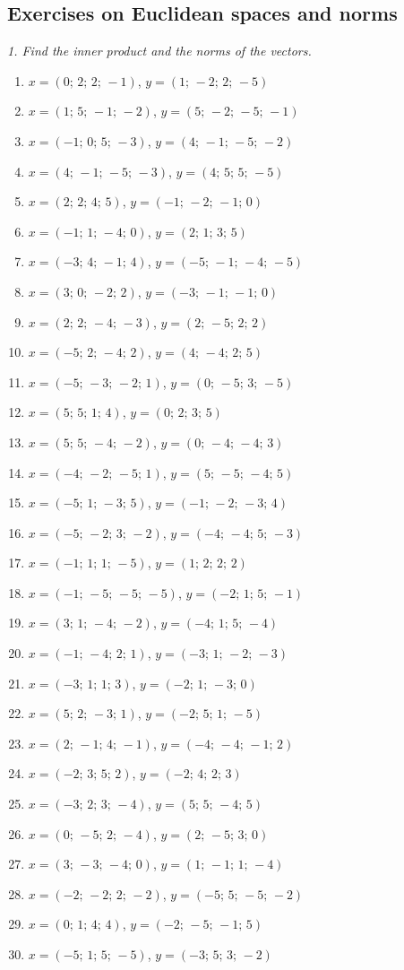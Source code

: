 \subsection{Exercises on Euclidean spaces and norms}

\emph{1. Find the inner product and the norms of the vectors.}
\bigskip
\begin{enumerate}[label=\arabic*., leftmargin=*]
\item $x=(0;\,2;\,2;\,-1)$, $y=(1;\,-2;\,2;\,-5)$
\item $x=(1;\,5;\,-1;\,-2)$, $y=(5;\,-2;\,-5;\,-1)$
\item $x=(-1;\,0;\,5;\,-3)$, $y=(4;\,-1;\,-5;\,-2)$
\item $x=(4;\,-1;\,-5;\,-3)$, $y=(4;\,5;\,5;\,-5)$
\item $x=(2;\,2;\,4;\,5)$, $y=(-1;\,-2;\,-1;\,0)$
\item $x=(-1;\,1;\,-4;\,0)$, $y=(2;\,1;\,3;\,5)$
\item $x=(-3;\,4;\,-1;\,4)$, $y=(-5;\,-1;\,-4;\,-5)$
\item $x=(3;\,0;\,-2;\,2)$, $y=(-3;\,-1;\,-1;\,0)$
\item $x=(2;\,2;\,-4;\,-3)$, $y=(2;\,-5;\,2;\,2)$
\item $x=(-5;\,2;\,-4;\,2)$, $y=(4;\,-4;\,2;\,5)$
\item $x=(-5;\,-3;\,-2;\,1)$, $y=(0;\,-5;\,3;\,-5)$
\item $x=(5;\,5;\,1;\,4)$, $y=(0;\,2;\,3;\,5)$
\item $x=(5;\,5;\,-4;\,-2)$, $y=(0;\,-4;\,-4;\,3)$
\item $x=(-4;\,-2;\,-5;\,1)$, $y=(5;\,-5;\,-4;\,5)$
\item $x=(-5;\,1;\,-3;\,5)$, $y=(-1;\,-2;\,-3;\,4)$
\item $x=(-5;\,-2;\,3;\,-2)$, $y=(-4;\,-4;\,5;\,-3)$
\item $x=(-1;\,1;\,1;\,-5)$, $y=(1;\,2;\,2;\,2)$
\item $x=(-1;\,-5;\,-5;\,-5)$, $y=(-2;\,1;\,5;\,-1)$
\item $x=(3;\,1;\,-4;\,-2)$, $y=(-4;\,1;\,5;\,-4)$
\item $x=(-1;\,-4;\,2;\,1)$, $y=(-3;\,1;\,-2;\,-3)$
\item $x=(-3;\,1;\,1;\,3)$, $y=(-2;\,1;\,-3;\,0)$
\item $x=(5;\,2;\,-3;\,1)$, $y=(-2;\,5;\,1;\,-5)$
\item $x=(2;\,-1;\,4;\,-1)$, $y=(-4;\,-4;\,-1;\,2)$
\item $x=(-2;\,3;\,5;\,2)$, $y=(-2;\,4;\,2;\,3)$
\item $x=(-3;\,2;\,3;\,-4)$, $y=(5;\,5;\,-4;\,5)$
\item $x=(0;\,-5;\,2;\,-4)$, $y=(2;\,-5;\,3;\,0)$
\item $x=(3;\,-3;\,-4;\,0)$, $y=(1;\,-1;\,1;\,-4)$
\item $x=(-2;\,-2;\,2;\,-2)$, $y=(-5;\,5;\,-5;\,-2)$
\item $x=(0;\,1;\,4;\,4)$, $y=(-2;\,-5;\,-1;\,5)$
\item $x=(-5;\,1;\,5;\,-5)$, $y=(-3;\,5;\,3;\,-2)$
\end{enumerate}

